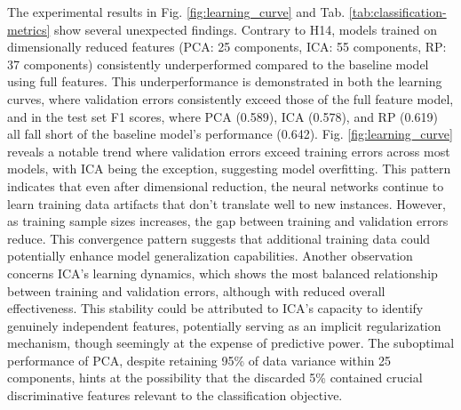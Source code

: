 \documentclass[conference]{IEEEtran}
\begin{document}
The experimental results in Fig. \ref{fig:learning_curve} and Tab. \ref{tab:classification-metrics} show several unexpected findings. Contrary to H14, models trained on dimensionally reduced features (PCA: 25 components, ICA: 55 components, RP: 37 components) consistently underperformed compared to the baseline model using full features. This underperformance is demonstrated in both the learning curves, where validation errors consistently exceed those of the full feature model, and in the test set F1 scores, where PCA (0.589), ICA (0.578), and RP (0.619) all fall short of the baseline model's performance (0.642). 
Fig. \ref{fig:learning_curve} reveals a notable trend where validation errors exceed training errors across most models, with ICA being the exception, suggesting model overfitting. This pattern indicates that even after dimensional reduction, the neural networks continue to learn training data artifacts that don't translate well to new instances. However, as training sample sizes increases, the gap between training and validation errors reduce. This convergence pattern suggests that additional training data could potentially enhance model generalization capabilities. Another observation concerns ICA's learning dynamics, which shows the most balanced relationship between training and validation errors, although with reduced overall effectiveness. This stability could be attributed to ICA's capacity to identify genuinely independent features, potentially serving as an implicit regularization mechanism, though seemingly at the expense of predictive power. The suboptimal performance of PCA, despite retaining 95\% of data variance within 25 components, hints at the possibility that the discarded 5\% contained crucial discriminative features relevant to the classification objective.
\end{document}
